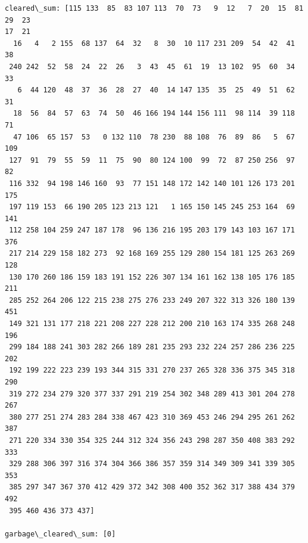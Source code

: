 \documentclass[11pt]{article}
\begin{document}
\begin{Verbatim}[commandchars=\\\{\}]
cleared\_sum: [115 133  85  83 107 113  70  73   9  12   7  20  15  81  29  23
17  21
  16   4   2 155  68 137  64  32   8  30  10 117 231 209  54  42  41  38
 240 242  52  58  24  22  26   3  43  45  61  19  13 102  95  60  34  33
   6  44 120  48  37  36  28  27  40  14 147 135  35  25  49  51  62  31
  18  56  84  57  63  74  50  46 166 194 144 156 111  98 114  39 118  71
  47 106  65 157  53   0 132 110  78 230  88 108  76  89  86   5  67 109
 127  91  79  55  59  11  75  90  80 124 100  99  72  87 250 256  97  82
 116 332  94 198 146 160  93  77 151 148 172 142 140 101 126 173 201 175
 197 119 153  66 190 205 123 213 121   1 165 150 145 245 253 164  69 141
 112 258 104 259 247 187 178  96 136 216 195 203 179 143 103 167 171 376
 217 214 229 158 182 273  92 168 169 255 129 280 154 181 125 263 269 128
 130 170 260 186 159 183 191 152 226 307 134 161 162 138 105 176 185 211
 285 252 264 206 122 215 238 275 276 233 249 207 322 313 326 180 139 451
 149 321 131 177 218 221 208 227 228 212 200 210 163 174 335 268 248 196
 299 184 188 241 303 282 266 189 281 235 293 232 224 257 286 236 225 202
 192 199 222 223 239 193 344 315 331 270 237 265 328 336 375 345 318 290
 319 272 234 279 320 377 337 291 219 254 302 348 289 413 301 204 278 267
 380 277 251 274 283 284 338 467 423 310 369 453 246 294 295 261 262 387
 271 220 334 330 354 325 244 312 324 356 243 298 287 350 408 383 292 333
 329 288 306 397 316 374 304 366 386 357 359 314 349 309 341 339 305 353
 385 297 347 367 370 412 429 372 342 308 400 352 362 317 388 434 379 492
 395 460 436 373 437]

garbage\_cleared\_sum: [0]


\end{Verbatim}
\end{document}
